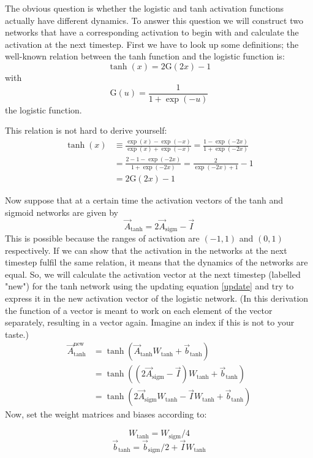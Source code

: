 \documentclass[10pt,a4paper]{report}
\begin{document}
The obvious question is whether the logistic and tanh activation functions actually have different dynamics. To answer this question we will construct two networks that have a corresponding activation to begin with and calculate the activation at the next timestep. First we have to look up some definitions; the well-known relation between the tanh function and the logistic function is:
\[ \tanh(x) = 2 \mathrm{G}(2x) - 1 \]
with
\[ \mathrm{G}(u) = \frac{1}{1 + \exp(-u)} \]
the logistic function.

This relation is not hard to derive yourself:
\begin{align*}
 \tanh(x) &\equiv \frac{\exp(x) - \exp(-x) }{\exp(x) + \exp(-x)} = \frac{1 - \exp(-2x)}{1 + \exp(-2x)}\\
  &  = \frac{2 - 1 - \exp(-2x)}{1 + \exp(-2x)} = \frac{2}{\exp(-2x) + 1} - 1 \\
  &= 2 \mathrm{G}(2x) - 1  
\end{align*}

Now suppose that at a certain time the activation vectors of the tanh and sigmoid networks are given by
\begin{equation}
\vec{A}_{\text{tanh}} = 2 \vec{A}_{\text{sigm}} - \vec{I} \label{transform}
\end{equation}
This is possible because the ranges of activation are $ (-1 , 1)  $ and $ (0 , 1) $ respectively. If we can show that the activation in the networks at the next timestep fulfil the same relation, it means that the dynamics of the networks are equal. So, we will calculate the activation vector at the next timestep (labelled "new") for the tanh network using the updating equation \ref{update} and try to express it in the new activation vector of the logistic network. (In this derivation the function of a vector is meant to work on each element of the vector separately, resulting in a vector again. Imagine an index if this is not to your taste.)
\begin{align*}
 \vec{A}_{\text{tanh}}^{\text{new}} &= \tanh(\vec{A}_{\text{tanh}} W_{\text{tanh}} + \vec{b}_{\text{tanh}} ) \\
 &= \tanh( ( 2 \vec{A}_{\text{sigm}} - \vec{I} ) W_{\text{tanh}} + \vec{b}_{\text{tanh}} )   \\
 &= \tanh( 2 \vec{A}_{\text{sigm}} W_{\text{tanh}} - \vec{I} W_{\text{tanh}} + \vec{b}_{\text{tanh}} )  
\end{align*}
Now, set the weight matrices and biases according to:

\begin{equation}
W_{\text{tanh}} = W_{\text{sigm}} / 4 \label{weights} 
\end{equation}
\begin{equation}
\vec{b}_{\text{tanh}} = \vec{b}_{\text{sigm}} / 2 + \vec{I} W_{\text{tanh}} \label{biases}
\end{equation}
\end{document}

